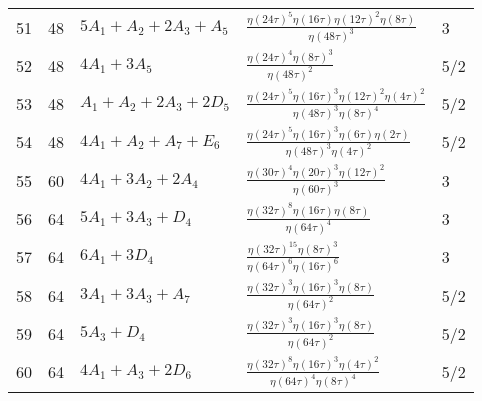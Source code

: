 \documentclass{amsart}
\theoremstyle{definition}
\begin{document}
\begin{longtable}{|l|l|l|l|l|}
  51 & 48 & $5 A_{1} +  A_{2} + 2 A_{3} +  A_{5}$ & ${\frac {  \eta \left( 24\tau \right)   ^{5}\eta \left( 16\tau \right)   \eta \left( 12\tau \right)   ^{2} \mbox{}\eta \left( 8\tau \right) }{  \eta \left( 48\tau \right)   ^{3}}}$ & 3 \\ 
  52 & 48 & $4 A_{1} + 3 A_{5}$ & ${\frac {  \eta \left( 24\tau \right)   ^{4}  \eta \left( 8\tau \right)   ^{3}}{  \eta \left( 48\tau \right)   ^{2}}}$ & 5/2 \\ 
  53 & 48 & $ A_{1} +  A_{2} + 2 A_{3} + 2 D_{5}$ & ${\frac {  \eta \left( 24\tau \right)   ^{5}  \eta \left( 16\tau \right)   ^{3}  \eta \left( 12\tau \right)   ^{2} \mbox{}  \eta \left( 4\tau \right)   ^{2}}{  \eta \left( 48\tau \right)   ^{3}  \eta \left( 8\tau \right)   ^{4}}}$ & 5/2 \\ 
  54 & 48 & $4 A_{1} +  A_{2} +  A_{7} +  E_{6}$ & ${\frac {  \eta \left( 24\tau \right)   ^{5}  \eta \left( 16\tau \right)   ^{3}\eta \left( 6\tau \right)  \mbox{}\eta \left( 2\tau \right) }{  \eta \left( 48\tau \right)   ^{3}  \eta \left( 4\tau \right)   ^{2}}}$ & 5/2 \\ 
  55 & 60 & $4 A_{1} + 3 A_{2} + 2 A_{4}$ & ${\frac {  \eta \left( 30\tau \right)   ^{4}  \eta \left( 20\tau \right)   ^{3}  \eta \left( 12\tau \right)   ^{2} \mbox{}}{  \eta \left( 60\tau \right)   ^{3}}}$ & 3 \\ 
  56 & 64 & $5 A_{1} + 3 A_{3} +  D_{4}$ & ${\frac {  \eta \left( 32\tau \right)   ^{8}\eta \left( 16\tau \right) \eta \left( 8\tau \right) }{  \eta \left( 64 \mbox{}\tau \right)   ^{4}}}$ & 3 \\ 
  57 & 64 & $6 A_{1} + 3 D_{4}$ & ${\frac {  \eta \left( 32\tau \right)   ^{15}  \eta \left( 8\tau \right)   ^{3}}{  \eta \left( 64\tau \right)   ^{6} \mbox{}  \eta \left( 16\tau \right)   ^{6}}}$ & 3 \\ 
  58 & 64 & $3 A_{1} + 3 A_{3} +  A_{7}$ & ${\frac {  \eta \left( 32\tau \right)   ^{3}  \eta \left( 16\tau \right)   ^{3}\eta \left( 8\tau \right)  \mbox{}}{  \eta \left( 64\tau \right)   ^{2}}}$ & 5/2 \\ 
  59 & 64 & $5 A_{3} +  D_{4}$ & ${\frac {  \eta \left( 32\tau \right)   ^{3}  \eta \left( 16\tau \right)   ^{3}\eta \left( 8\tau \right)  \mbox{}}{  \eta \left( 64\tau \right)   ^{2}}}$ & 5/2 \\ 
  60 & 64 & $4 A_{1} +  A_{3} + 2 D_{6}$ & ${\frac {  \eta \left( 32\tau \right)   ^{8}  \eta \left( 16\tau \right)   ^{3}  \eta \left( 4\tau \right)   ^{2} \mbox{}}{  \eta \left( 64\tau \right)   ^{4}  \eta \left( 8\tau \right)   ^{4}}}$ & 5/2 \\ 

\end{longtable}
\end{document}
